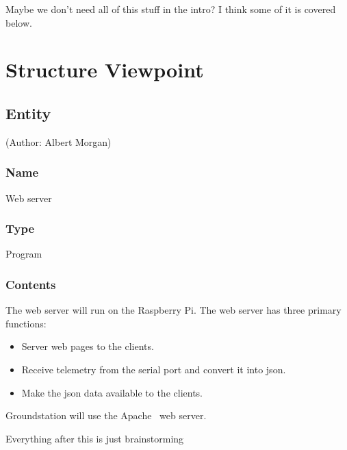 \documentclass[10pt,draftclsnofoot,onecolumn]{IEEEtran}
\newcommand{\newelement}[5]{
	\subsection{#1} (Author: #2)
	\subsubsection{Name}
	#3
	\subsubsection{Type}
	#4
	\subsubsection{Contents}
	#5
}
\begin{document}
	Maybe we don't need all of this stuff in the intro? I think some of it is covered below.

	
	
	\section{Structure Viewpoint}
		
	
	
	
	\newelement
	{Entity}
	{Albert Morgan}
	{Web server}
	{Program}
	{	The web server will run on the Raspberry Pi. The web server has three primary functions:
		\begin{itemize}
			\item Server web pages to the clients.
			\item Receive telemetry from the serial port and convert it into json.
			\item Make the json data available to the clients.
		\end{itemize}
		Groundstation will use the Apache~\cite{Apache} web server.
	}


	
	
	
	
	
	\vspace{1in}
	{\Huge Everything after this is just brainstorming}
	
\end{document}
